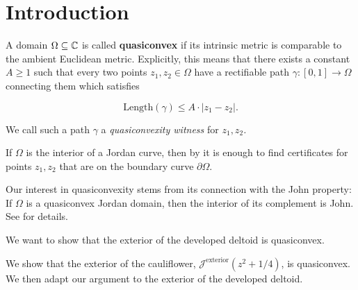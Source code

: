 


\section{Introduction}
A domain $\Omega\subseteq\mathbb{C}$ is called \textbf{quasiconvex }if its
intrinsic metric is comparable to the ambient Euclidean metric. Explicitly,
this means that there exists a constant $A\geq1$ such that every
two points $z_{1},z_{2}\in\Omega$ have a rectifiable path $\gamma:\left[0,1\right]\to\Omega$
connecting them which satisfies %
\begin{comment}
Let $X$ be a path-connected subset of the plane. A rectifiable path
$\gamma:\left[0,1\right]\to X$ is called $C$\textbf{-quasiconvex,
}for some constant $C$, if its length satisfies
\end{comment}
{} 
\[
\mathrm{Length}(\gamma)\leq A\cdot\left|z_{1}-z_{2}\right|.
\]

We call such a path $\gamma$ a \emph{quasiconvexity witness }for\emph{
$z_{1},z_{2}$.}%
\begin{comment}
The space $X$ is called \textbf{quasiconvex }if there is a constant
$C$ such that every pair of points $z_{1},z_{2}\in X$ can be connected
by a $C$-quasiconvex path. In other words, the intrinsic metric on
$X$ is comparable to the ambient Euclidean metric. 
\end{comment}

If $\Omega$ is the interior of a Jordan curve, then by \cite[Corollary F]{key-1}
it is enough to find certificates for points $z_{1},z_{2}$ that are
on the boundary curve $\partial\Omega$.%
\begin{comment}
It is also shown in \cite{key-1} that any quasidisk is quasiconvex.
\end{comment}

Our interest in quasiconvexity stems from its connection with the
John property: If $\Omega$ is a quasiconvex Jordan domain, then the
interior of its complement is John. See \cite[Corollary 3.4]{key-1}
for details. 

We want to show that the exterior of the developed deltoid is quasiconvex. 

We show that the exterior of the cauliflower, $\mathcal{J}^{\text{exterior}}(z^{2}+1/4)$,
is quasiconvex. We then adapt our argument to the exterior of the developed deltoid.

\begin{comment}
The Filled Julia set of $z^{2}+1/4$, called the cauliflower, has
an inward-pointing cusp and hence is not quasiconvex.
\end{comment}

